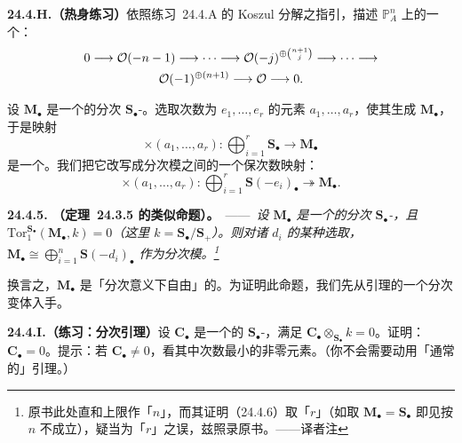 \textbf{24.4.H.（热身练习）}\quad 依照\mbox{练习~24.4.A} 的 Koszul 分解之指引，描述 $\mathbb{P}^n_A$ 上的一个\trExactSequence：
\begin{multline*}
0 \longrightarrow \mathcal{O}(-n-1) \longrightarrow \cdots \longrightarrow \mathcal{O}(-j)^{\oplus\binom{n+1}{j}} \longrightarrow \cdots \longrightarrow \\
\mathcal{O}(-1)^{\oplus(n+1)} \longrightarrow \mathcal{O} \longrightarrow 0.
\end{multline*}

设 $\mathbf{M}_\bullet$ 是一个\trFinitelyGenerated{}的分次 $\mathbf{S}_\bullet$-\trModule。选取次数为 $e_1,\dots,e_r$ 的\trHomogeneous{}元素 $a_1,\dots,a_r$，使其生成 $\mathbf{M}_\bullet$，于是映射
\[
\times(a_1,\dots,a_r)\colon \bigoplus_{i=1}^{r}\mathbf{S}_\bullet \longrightarrow \mathbf{M}_\bullet
\]
是一个\trSurjectiveMap。我们把它改写成分次模之间的一个保次数映射：
\[
\times(a_1,\dots,a_r)\colon \bigoplus_{i=1}^{r}\mathbf{S}(-e_i)_\bullet \twoheadrightarrow \mathbf{M}_\bullet.
\]

\textbf{24.4.5. \trhProposition（\mbox{定理~24.3.5} 的类似命题）。}\ ——\ \emph{设 $\mathbf{M}_\bullet$ 是一个\trFinitelyGenerated{}的分次 $\mathbf{S}_\bullet$-\trModule，且 $\mathrm{Tor}_1^{\mathbf{S}_\bullet}(\mathbf{M}_\bullet,k)=0$（这里 $k=\mathbf{S}_\bullet/\mathbf{S}_+$）。则对诸 $d_i$ 的某种选取，$\mathbf{M}_\bullet\cong\bigoplus_{i=1}^{n}\mathbf{S}(-d_i)_\bullet$ 作为分次模。\footnote{原书此处直和上限作「$n$」，而其证明（24.4.6）取「$r$」（如取 $\mathbf{M}_\bullet=\mathbf{S}_\bullet$ 即见按 $n$ 不成立），疑当为「$r$」之误，兹照录原书。——译者注}}

换言之，$\mathbf{M}_\bullet$ 是「分次意义下自由」的。为证明此命题，我们先从\trNakayama{}引理的一个分次变体入手。

\textbf{24.4.I.（练习：分次\trNakayama{}引理）}\quad 设 $\mathbf{C}_\bullet$ 是一个\trFinitelyGenerated{}的 $\mathbf{S}_\bullet$-\trModule，满足 $\mathbf{C}_\bullet\otimes_{\mathbf{S}_\bullet}k=0$。证明：$\mathbf{C}_\bullet=0$。提示：若 $\mathbf{C}_\bullet\neq 0$，看其中次数最小的非零元素。（你不会需要动用「通常的」\trNakayama{}引理。）

